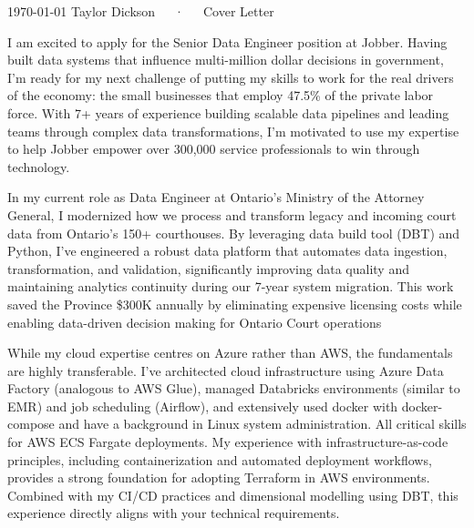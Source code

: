 \documentclass[11pt, letterpaper]{awesome-cv}
\begin{document}
\makecvheader[R]

\makecvfooter%
  {\today}
  {Taylor Dickson~~~·~~~Cover Letter}
  {}

\makelettertitle%

\begin{cvletter}
I am excited to apply for the Senior Data Engineer position at Jobber. Having built data systems that influence multi-million dollar decisions in government, I'm ready for my next challenge of putting my skills to work for the real drivers of the economy: the small businesses that employ 47.5\% of the private labor force. With 7+ years of experience building scalable data pipelines and leading teams through complex data transformations, I'm motivated to use my expertise to help Jobber empower over 300,000 service professionals to win through technology.

In my current role as Data Engineer at Ontario's Ministry of the Attorney General, I modernized how we process and transform legacy and incoming court data from Ontario's 150+ courthouses. By leveraging data build tool (DBT) and Python, I've engineered a robust data platform that automates data ingestion, transformation, and validation, significantly improving data quality and maintaining analytics continuity during our 7-year system migration. This work saved the Province \$300K annually by eliminating expensive licensing costs while enabling data-driven decision making for Ontario Court operations

While my cloud expertise centres on Azure rather than AWS, the fundamentals are highly transferable. I've architected cloud infrastructure using Azure Data Factory (analogous to AWS Glue), managed Databricks environments (similar to EMR) and job scheduling (Airflow), and extensively used docker with docker-compose and have a background in Linux system administration. All critical skills for AWS ECS Fargate deployments. My experience with infrastructure-as-code principles, including containerization and automated deployment workflows, provides a strong foundation for adopting Terraform in AWS environments. Combined with my CI/CD practices and dimensional modelling using DBT, this experience directly aligns with your technical requirements.


\end{cvletter}
\end{document}
